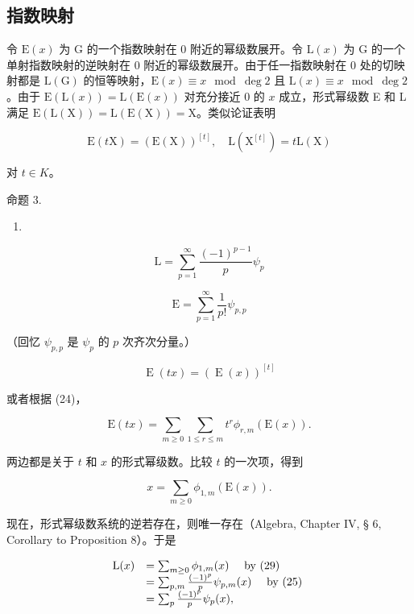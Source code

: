 \subsection{指数映射}

令 \(\mathrm{E}(x)\) 为 G 的一个指数映射在 0 附近的幂级数展开。令 \(\mathrm{L}(x)\) 为 G 的一个单射指数映射的逆映射在 0 附近的幂级数展开。由于任一指数映射在 0 处的切映射都是 \(\mathrm{L}(\mathrm{G})\) 的恒等映射，\(\mathrm{E}(x) \equiv x \mod \deg 2\) 且 \(\mathrm{L}(x) \equiv x \mod \deg 2\)。由于 \(\mathrm{E}(\mathrm{L}(x)) = \mathrm{L}(\mathrm{E}(x))\) 对充分接近 0 的 \(x\) 成立，形式幂级数 E 和 L 满足 \(\mathrm{E}(\mathrm{L}(\mathrm{X})) = \mathrm{L}(\mathrm{E}(\mathrm{X})) = \mathrm{X}\)。类似论证表明

\[
\mathrm{E} (t \mathrm{X}) = (\mathrm{E} (\mathrm{X})) ^ {[ t ]}, \quad \mathrm{L} (\mathrm{X} ^ {[ t ]}) = t \mathrm{L} (\mathrm{X})
\]

对 \(t \in K\)。

命题 3.

\begin{enumerate}
\def\labelenumi{(\arabic{enumi})}
\setcounter{enumi}{26}
\tightlist
\item
\end{enumerate}

\[
\mathrm{L} = \sum_ {p = 1} ^ {\infty} \frac {(- 1) ^ {p - 1}}{p} \psi_ {p}\tag{27}
\]

\[
\mathrm{E} = \sum_ {p = 1} ^ {\infty} \frac {1}{p !} \psi_ {p, p}\tag{28}
\]

（回忆 \(\psi_{p,p}\) 是 \(\psi_{p}\) 的 \(p\) 次齐次分量。）

\[
\operatorname{E} (t x) = (\operatorname{E} (x)) ^ {[ t ]}
\]

或者根据 (24)，

\[
\mathrm{E} (t x) = \sum_ {m \geqslant 0} \sum_ {1 \leqslant r \leqslant m} t ^ {r} \phi_ {r, m} (\mathrm{E} (x)).
\]

两边都是关于 \(t\) 和 \(x\) 的形式幂级数。比较 \(t\) 的一次项，得到

\[
x = \sum_ {m \geqslant 0} \phi_ {1, m} (\mathrm{E} (x)).\tag{29}
\]

现在，形式幂级数系统的逆若存在，则唯一存在（Algebra, Chapter IV, § 6, Corollary to Proposition 8）。于是

\[
\begin{array}{r l} \mathrm{L} (x) & = \sum_ {m \geq 0} \phi_ {1, m} (x) \quad \text { by   (29) } \\ & = \sum_ {p, m} \frac {(- 1) ^ {p}}{p} \psi_ {p, m} (x) \quad \text { by   (25) } \\ & = \sum_ {p} \frac {(- 1) ^ {p}}{p} \psi_ {p} (x), \end{array}
\]

